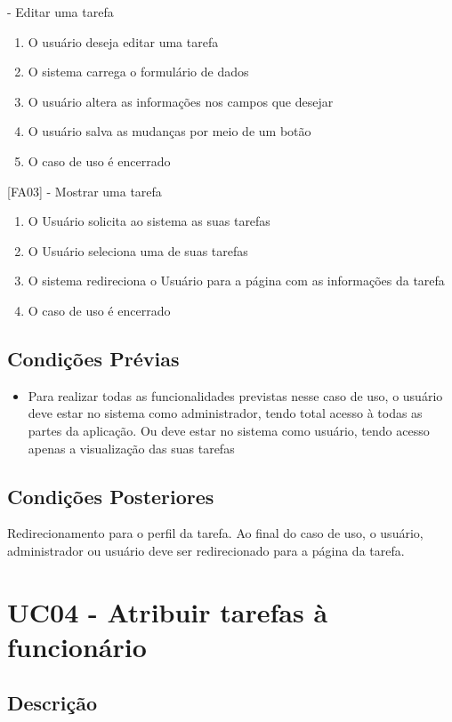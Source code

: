 \begin{apendicesenv}
[FA02] - Editar uma tarefa
\begin{enumerate}
  \item{O usuário deseja editar uma tarefa}
  \item{O sistema carrega o formulário de dados}
  \item{O usuário altera as informações nos campos que desejar}
  \item{O usuário salva as mudanças por meio de um botão}
  \item{O caso de uso é encerrado}
\end{enumerate}


[FA03] - Mostrar uma tarefa
\begin{enumerate}
  \item{O Usuário solicita ao sistema as suas tarefas}
  \item{O Usuário seleciona uma de suas tarefas}
  \item{O sistema redireciona o Usuário para a página com as informações da tarefa}
  \item{O caso de uso é encerrado}
\end{enumerate}

\subsection{Condições Prévias}
\begin{itemize}
\item{Para realizar todas as funcionalidades previstas nesse caso de uso, o usuário deve estar no sistema como administrador, tendo total acesso à todas as partes da aplicação. Ou deve estar no sistema como usuário, tendo acesso apenas a visualização das suas tarefas}
\end{itemize}

\subsection{Condições Posteriores}

Redirecionamento para o perfil da tarefa. Ao final do caso de uso, o usuário, administrador ou usuário deve ser redirecionado para a página da tarefa.


\section{UC04 - Atribuir tarefas à funcionário}

\subsection{Descrição}


\end{apendicesenv}
